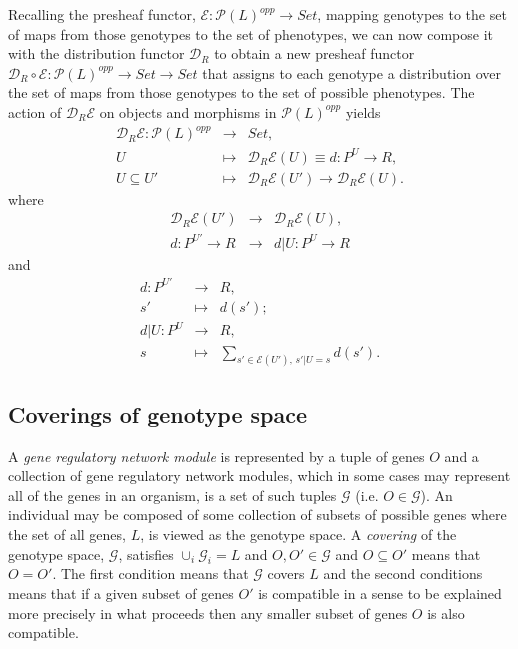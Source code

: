 Recalling the presheaf functor, $\mathcal{E} \colon \mathcal{P}(L)^{opp} \rightarrow Set$, mapping genotypes to the set of maps from those genotypes to the set of phenotypes, we can now compose it with the distribution functor $\mathcal{D}_R$ to obtain a new presheaf functor $\mathcal{D}_R \circ \mathcal{E} \colon \mathcal{P}(L)^{opp} \rightarrow Set \rightarrow Set$ that assigns to each genotype a distribution over the set of maps from those genotypes to the set of possible phenotypes. The action of $\mathcal{D}_R \mathcal{E}$ on objects and morphisms in $\mathcal{P}(L)^{opp}$ yields
\begin{eqnarray*}
\mathcal{D}_R \mathcal{E} \colon \mathcal{P}(L)^{opp} &\rightarrow& Set,\\
U &\mapsto& \mathcal{D}_R \mathcal{E}(U) \equiv d \colon P^U \rightarrow R,\\
U \subseteq U' &\mapsto& \mathcal{D}_R \mathcal{E}(U') \rightarrow \mathcal{D}_R \mathcal{E}(U).
\end{eqnarray*}
where
\begin{eqnarray*}
\mathcal{D}_R \mathcal{E}(U') &\rightarrow& \mathcal{D}_R \mathcal{E}(U),\\
d \colon P^{U'} \rightarrow R &\rightarrow& d|U \colon P^{U} \rightarrow R
\end{eqnarray*}
and
\begin{eqnarray*}
d \colon P^{U'} &\rightarrow& R,\\
s' &\mapsto& d(s');\\
d|U \colon P^{U} &\rightarrow& R,\\
s &\mapsto& \sum_{s' \in \mathcal{E}(U'),\, s'|U=s} d(s').
\end{eqnarray*}

\subsection*{Coverings of genotype space}
A \emph{gene regulatory network module} is represented by a tuple of genes $O$ and a collection of gene regulatory network modules, which in some cases may represent all of the genes in an organism, is a set of such tuples $\mathcal{G}$ (i.e. $O \in \mathcal{G}$). An individual may be composed of some collection of subsets of possible genes where the set of all genes, $L$, is viewed as the genotype space. A \emph{covering} of the genotype space, $\mathcal{G}$, satisfies $\cup_i \mathcal{G}_i = L$ and $O,O' \in \mathcal{G}$ and $O \subseteq O'$ means that $O = O'$. The first condition means that $\mathcal{G}$ covers $L$ and the second conditions means that if a given subset of genes $O'$ is compatible in a sense to be explained more precisely in what proceeds then any smaller subset of genes $O$ is also compatible.

